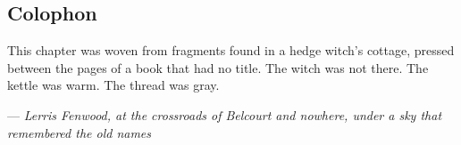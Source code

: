 \documentclass[11pt]{article}
\begin{document}
\begin{center}
\end{center}

\subsection{Colophon}

This chapter was woven from fragments found in a hedge witch's cottage, pressed between the pages of a book that had no title. The witch was not there. The kettle was warm. The thread was gray.

--- \textit{Lerris Fenwood, at the crossroads of Belcourt and nowhere, under a sky that remembered the old names}
\end{document}
